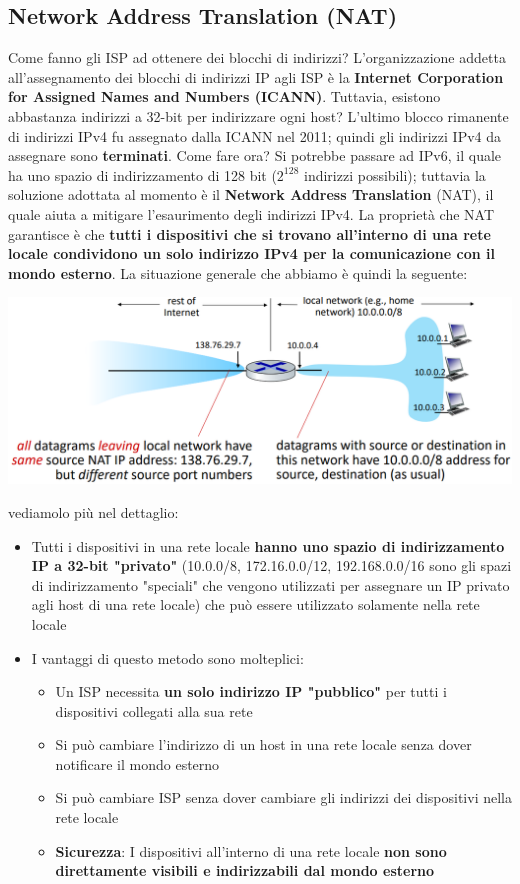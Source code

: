 \documentclass[12pt]{article}
\begin{document}
\subsection{Network Address Translation (NAT)}
Come fanno gli ISP ad ottenere dei blocchi di indirizzi?
L'organizzazione addetta all'assegnamento dei blocchi di indirizzi IP agli ISP è la \textbf{Internet Corporation for Assigned Names and Numbers (ICANN)}.
Tuttavia, esistono abbastanza indirizzi a 32-bit per indirizzare ogni host?
L'ultimo blocco rimanente di indirizzi IPv4 fu assegnato dalla ICANN nel 2011; quindi gli indirizzi IPv4 da assegnare sono \textbf{terminati}.
Come fare ora? Si potrebbe passare ad IPv6, il quale ha uno spazio di indirizzamento di 128 bit ($2^{128}$ indirizzi possibili); tuttavia la soluzione adottata al momento è il \textbf{Network Address Translation} (NAT), il quale
aiuta a mitigare l'esaurimento degli indirizzi IPv4.
La proprietà che NAT garantisce è che \textbf{tutti i dispositivi che si trovano all'interno di una rete locale condividono un solo indirizzo IPv4 per la comunicazione con il mondo esterno}. La situazione generale che abbiamo è quindi la seguente:
\begin{center}
    \includegraphics[width =1\linewidth]{Images/94.png}
\end{center}
vediamolo più nel dettaglio:
\begin{itemize}
    \item Tutti i dispositivi in una rete locale \textbf{hanno uno spazio di indirizzamento IP a 32-bit "privato"} (10.0.0/8, 172.16.0.0/12, 192.168.0.0/16 sono gli spazi di indirizzamento "speciali" che vengono utilizzati per assegnare un IP privato agli host di una rete locale) che può essere utilizzato solamente nella rete locale
    \item I vantaggi di questo metodo sono molteplici:
    \begin{itemize}
        \item Un ISP necessita \textbf{un solo indirizzo IP "pubblico"} per tutti i dispositivi collegati alla sua rete
        \item Si può cambiare l'indirizzo di un host in una rete locale senza dover notificare il mondo esterno
        \item Si può cambiare ISP senza dover cambiare gli indirizzi dei dispositivi nella rete locale
        \item \textbf{Sicurezza}: I dispositivi all'interno di una rete locale \textbf{non sono direttamente visibili e indirizzabili dal mondo esterno}
    \end{itemize}
\end{itemize}
\end{document}
